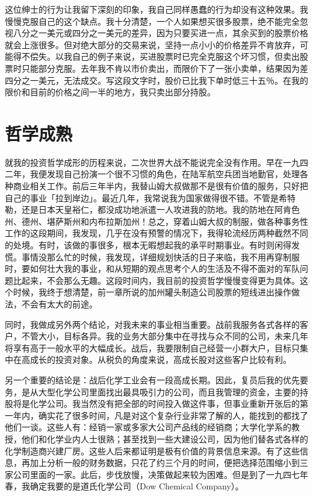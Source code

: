 \documentclass[UTF8,a4paper,zihao=-4,fontset = windows]{ctexart} %
\begin{document}
这位绅士的行为让我留下深刻的印象，我自己同样愚蠢的行为却没有这种效果。我慢慢克服自己的这个缺点。我十分清楚，一个人如果想买很多股票，绝不能完全忽视八分之一美元或四分之一美元的差异，因为只要买进一点，其余买到的股票价格就会上涨很多。但对绝大部分的交易来说，坚持一点小小的价格差异不肯放弃，可能得不偿失。以我自己的例子来说，买进股票时已完全克服这个坏习惯，但卖出股票时只能部分克服。去年我不肯以市价卖出，而限价下了一张小卖单，结果因为差四分之一美元，无法成交。写这段文字时，股价已比我下单时低三十五％。在我的限价和目前的价格之间一半的地方，我只卖出部分持股。

\section{哲学成熟}

就我的投资哲学成形的历程来说，二次世界大战不能说完全没有作用。早在一九四二年，我便发现自己扮演一个很不习惯的角色，在陆军航空兵团当地勤官，处理各种商业相关工作。前后三年半内，我替山姆大叔做那不是很有价值的服务，只好把自己的事业「拉到岸边」。最近几年，我常说我为国家做得很不错。不管是希特勒，还是日本天皇裕仁，都没成功地派遣一人攻进我的防地。我的防地在阿肯色州、德州、堪萨斯州和内布拉斯加州！总之，穿着山姆大叔的制服，做各种事务性工作的这段期间，我发现，几乎在没有预警的情况下，我得轮流经历两种截然不同的处境。有时，该做的事很多，根本无暇想起我的承平时期事业。有时则闲得发慌。事情没那么忙的时候，我发现，详细规划快活的日子来临，我不用再穿制服时，要如何壮大我的事业，和从短期的观点思考个人的生活及不得不面对的军队问题比起来，不会那么无趣。这段时间内，我目前的投资哲学慢慢变得更为具体。这个时候，我终于想清楚，前一章所说的加州罐头制造公司股票的短线进出操作做法，不会有太大的前途。

同时，我做成另外两个结论，对我未来的事业相当重要。战前我服务各式各样的客户，不管大小，目标各异。我的业务大部分集中在寻找与众不同的公司，未来几年将享有高于一般水平的大幅成长。战后，我要限制自己经营一小群大户，目标只集中在高成长的投资对象。从税负的角度来说，高成长股对这些客户比较有利。

另一个重要的结论是：战后化学工业会有一段高成长期。因此，复员后我的优先要务，是从大型化学公司里面找出最具吸引力的公司，而且我管理的资金，主要的持股将是化学公司。我当然没有把全部的时间投入做这件事，但事业重新开张后的第一年内，确实花了很多时间，凡是对这个复杂行业非常了解的人，能找到的都找了他们一谈。这些人有：经销一家或多家大公司产品线的经销商；大学化学系的教授，他们和化学业内人士很熟；甚至找到一些大建设公司，因为他们替各式各样的化学制造商兴建厂房。这些人后来都证明是极有价值的背景信息来源。有了这些信息，再加上分析一般的财务数据，只花了约三个月的时间，便把选择范围缩小到三家公司里面的一家。此后，步伐放慢，决策做起来较为困难。但是到了一九四七年春，我确定我要的是道氏化学公司（Dow Chemical Company）。
\\
\end{document}
